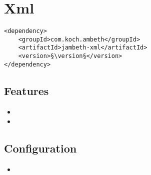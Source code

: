 \section{Xml}
\label{module:Xml}
\ClearAPI
\TODO
\begin{lstlisting}[style=POM,caption={Maven modules to use \emph{Ambeth Xml}}]
<dependency>
	<groupId>com.koch.ambeth</groupId>
	<artifactId>jambeth-xml</artifactId>
	<version>§\version§</version>
</dependency>
\end{lstlisting}
\subsection{Features}
\begin{itemize}
	\item {}
	\item {}
\end{itemize}

\subsection{Configuration}
\begin{itemize}
	\item {}
\end{itemize}
